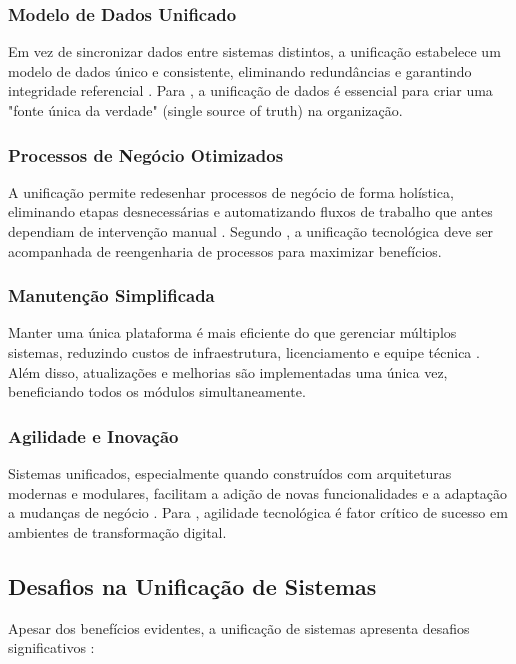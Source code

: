 \subsubsection{Modelo de Dados Unificado}

Em vez de sincronizar dados entre sistemas distintos, a unificação estabelece um modelo de dados único e consistente, eliminando redundâncias e garantindo integridade referencial \cite{elmasri2016}. Para \cite{inmon2005}, a unificação de dados é essencial para criar uma "fonte única da verdade" (single source of truth) na organização.
\subsubsection{Processos de Negócio Otimizados}

A unificação permite redesenhar processos de negócio de forma holística, eliminando etapas desnecessárias e automatizando fluxos de trabalho que antes dependiam de intervenção manual \cite{davenport1993}. Segundo \cite{hammer2001}, a unificação tecnológica deve ser acompanhada de reengenharia de processos para maximizar benefícios.

\subsubsection{Manutenção Simplificada}

Manter uma única plataforma é mais eficiente do que gerenciar múltiplos sistemas, reduzindo custos de infraestrutura, licenciamento e equipe técnica \cite{pressman2016}. Além disso, atualizações e melhorias são implementadas uma única vez, beneficiando todos os módulos simultaneamente.
\subsubsection{Agilidade e Inovação}

Sistemas unificados, especialmente quando construídos com arquiteturas modernas e modulares, facilitam a adição de novas funcionalidades e a adaptação a mudanças de negócio \cite{ross2006}. Para \cite{westerman2014}, agilidade tecnológica é fator crítico de sucesso em ambientes de transformação digital.

\subsection{Desafios na Unificação de Sistemas}

Apesar dos benefícios evidentes, a unificação de sistemas apresenta desafios significativos \cite{linthicum2000}:

